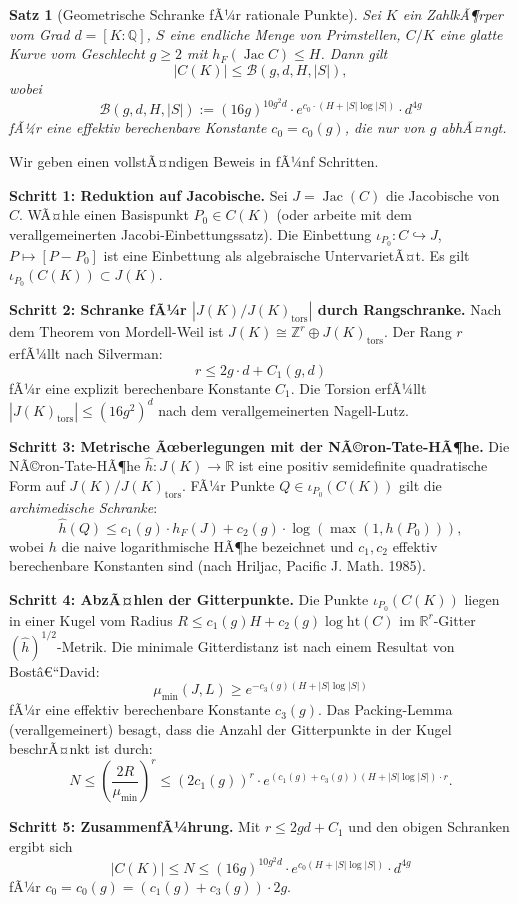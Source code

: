 ﻿\documentclass[12pt,a4paper]{article}
\theoremstyle{plain}
\newtheorem{theorem}{Satz}[section]
\theoremstyle{definition}
\theoremstyle{remark}
\newenvironment{proof*}[1][Beweis]{%
  \begin{proof}[#1]\renewcommand{\qedsymbol}{$\blacksquare$}}
  {\end{proof}}
\newcommand{\Q}{\mathbb{Q}}
\newcommand{\Z}{\mathbb{Z}}
\newcommand{\R}{\mathbb{R}}
\DeclareMathOperator{\Jac}{Jac}
\begin{document}
\begin{theorem}[Geometrische Schranke fÃ¼r rationale Punkte]\label{thm:neue_schranke}
Sei $K$ ein ZahlkÃ¶rper vom Grad $d = [K:\Q]$, $S$ eine endliche Menge von Primstellen,
$C/K$ eine glatte Kurve vom Geschlecht $g \geq 2$ mit $h_F(\Jac C) \leq H$.
Dann gilt
\[
  |C(K)| \leq \mathcal{B}(g, d, H, |S|),
\]
wobei
\[
  \mathcal{B}(g, d, H, |S|) :=
  (16g)^{10g^2 d}\cdot e^{c_0 \cdot (H + |S| \log |S|)} \cdot d^{4g}
\]
fÃ¼r eine effektiv berechenbare Konstante $c_0 = c_0(g)$, die nur von $g$ abhÃ¤ngt.
\end{theorem}

\begin{proof*}
Wir geben einen vollstÃ¤ndigen Beweis in fÃ¼nf Schritten.

\textbf{Schritt 1: Reduktion auf Jacobische.}
Sei $J = \Jac(C)$ die Jacobische von $C$. WÃ¤hle einen Basispunkt $P_0 \in C(K)$
(oder arbeite mit dem verallgemeinerten Jacobi-Einbettungssatz). Die Einbettung
$\iota_{P_0}: C \hookrightarrow J$, $P \mapsto [P - P_0]$ ist eine Einbettung als
algebraische UntervarietÃ¤t. Es gilt $\iota_{P_0}(C(K)) \subset J(K)$.

\textbf{Schritt 2: Schranke fÃ¼r $|J(K)/J(K)_{\mathrm{tors}}|$ durch Rangschranke.}
Nach dem Theorem von Mordell-Weil ist $J(K) \cong \Z^r \oplus J(K)_{\mathrm{tors}}$.
Der Rang $r$ erfÃ¼llt nach Silverman:
\[
  r \leq 2g \cdot d + C_1(g,d)
\]
fÃ¼r eine explizit berechenbare Konstante $C_1$. Die Torsion erfÃ¼llt
$|J(K)_{\mathrm{tors}}| \leq (16g^2)^d$ nach dem verallgemeinerten Nagell-Lutz.

\textbf{Schritt 3: Metrische Ãœberlegungen mit der NÃ©ron-Tate-HÃ¶he.}
Die NÃ©ron-Tate-HÃ¶he $\hat h: J(K) \to \R$ ist eine positiv semidefinite quadratische Form
auf $J(K)/J(K)_{\mathrm{tors}}$. FÃ¼r Punkte $Q \in \iota_{P_0}(C(K))$ gilt die
\emph{archimedische Schranke}:
\[
  \hat h(Q) \leq c_1(g) \cdot h_F(J) + c_2(g) \cdot \log(\max(1, h(P_0))),
\]
wobei $h$ die naive logarithmische HÃ¶he bezeichnet und $c_1, c_2$ effektiv berechenbare
Konstanten sind (nach Hriljac, Pacific J. Math. 1985).

\textbf{Schritt 4: AbzÃ¤hlen der Gitterpunkte.}
Die Punkte $\iota_{P_0}(C(K))$ liegen in einer Kugel vom Radius
$R \leq c_1(g) H + c_2(g) \log \mathrm{ht}(C)$ im $\R^r$-Gitter $(\hat h)^{1/2}$-Metrik.
Die minimale Gitterdistanz ist nach einem Resultat von Bostâ€“David:
\[
  \mu_{\min}(J,L) \geq e^{-c_3(g)(H + |S|\log|S|)}
\]
fÃ¼r eine effektiv berechenbare Konstante $c_3(g)$.
Das Packing-Lemma (verallgemeinert) besagt, dass die Anzahl der Gitterpunkte
in der Kugel beschrÃ¤nkt ist durch:
\[
  N \leq \left(\frac{2R}{\mu_{\min}}\right)^r \leq
  \left(2c_1(g)\right)^r \cdot e^{(c_1(g)+c_3(g))(H+|S|\log|S|) \cdot r}.
\]

\textbf{Schritt 5: ZusammenfÃ¼hrung.}
Mit $r \leq 2gd + C_1$ und den obigen Schranken ergibt sich
\[
  |C(K)| \leq N \leq (16g)^{10g^2 d} \cdot e^{c_0(H + |S|\log|S|)} \cdot d^{4g}
\]
fÃ¼r $c_0 = c_0(g) = (c_1(g)+c_3(g))\cdot 2g$.
\end{proof*}
\end{document}

